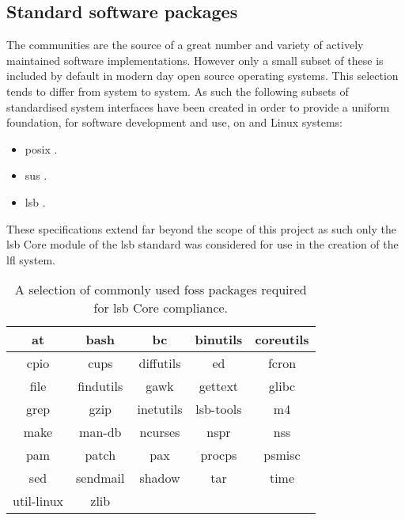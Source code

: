 \subsection{Standard software packages}

The  communities are the source of a great number and variety of actively maintained software implementations. However only a small subset of these is included by default in modern day open source operating systems. This selection tends to differ from system to system. As such the following subsets of standardised system interfaces have been created in order to provide a uniform foundation, for software development and use, on  and Linux systems:

\begin{itemize}
    \item \gls{posix} \cite{posix}.
    \item \gls{sus} \cite{susv4}.
    \item \gls{lsb} \cite{lsb}.
\end{itemize}

These specifications extend far beyond the scope of this project as such only the \gls{lsb} Core module of the \gls{lsb} standard was considered for use in the creation of the \gls{lfl} system.

\begin{table}[H]
    \centering
    \begin{tabular}{|c|c|c|c|c|}
        \hline
        at & bash & bc & binutils & coreutils \\
        \hline
        cpio & cups & diffutils & ed & fcron \\
        \hline
        file & findutils & gawk & gettext & glibc \\
        \hline
        grep & gzip & inetutils & lsb-tools & m4 \\
        \hline
        make & man-db & ncurses & nspr & nss \\
        \hline
        pam & patch & pax & procps & psmisc \\
        \hline
        sed & sendmail & shadow & tar & time \\
        \hline
        util-linux & zlib \\
        \cline{1-2}
    \end{tabular}
    \caption{A selection of commonly used \gls{foss} packages required for \gls{lsb} Core compliance.}
    \label{table:LSB Core standard packages}
\end{table}

